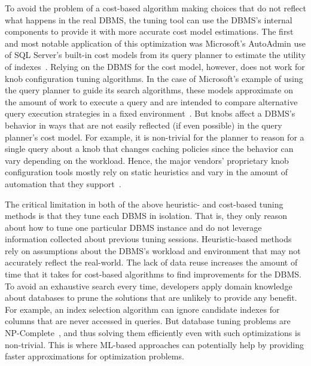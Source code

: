 \documentclass[11pt,times]{article}
\begin{document}
To avoid the problem of a cost-based algorithm making choices that do not reflect what happens in 
the real DBMS, the tuning tool can use the DBMS's internal components to provide it with more 
accurate cost model estimations. The 
first and most notable application of this optimization was Microsoft's AutoAdmin use of SQL 
Server's built-in cost models from its query planner to estimate 
the utility of indexes~\cite{chaudhuri98}.
Relying on the DBMS for the cost model, however, does not work for knob configuration tuning 
algorithms. In the case of Microsoft's example of using the query planner to guide its search 
algorithms, these models approximate on the amount of work to execute a query and 
are intended to compare alternative query execution strategies in a fixed 
environment~\cite{soror08}. But knobs affect a DBMS's behavior in ways that are not easily reflected 
(if even possible) in the query planner's cost model. For example, it is non-trivial for the 
planner 
to reason for a single query about a knob that changes caching policies since the behavior can vary 
depending on the 
workload. Hence, the major vendors' proprietary knob configuration tools mostly rely on static 
heuristics and vary in the amount of automation that they 
support~\cite{dias05,kumar03,narayanan05,mysql-tuning-primer,postgres-pgtune}.

The critical limitation in both of the above heuristic- and cost-based tuning methods is that they 
tune each DBMS in isolation. That is, they only reason about how to tune one particular DBMS 
instance and do not leverage information collected about previous tuning sessions.
Heuristic-based methods rely on assumptions about the DBMS's workload and environment that may not 
accurately reflect the real-world.
The lack of data reuse increases the amount of time that it takes for cost-based algorithms to find 
improvements for the DBMS. To avoid an exhaustive search every time, developers apply domain 
knowledge about databases to prune the solutions that are unlikely to provide any benefit. For 
example, an index selection algorithm can ignore candidate indexes for columns that are never 
accessed in queries. But database tuning problems are NP-Complete~\cite{mukkamala88,ip83}, and thus 
solving them efficiently even with such optimizations is non-trivial. This is where ML-based 
approaches can potentially help by providing faster approximations for optimization problems.

\end{document}
